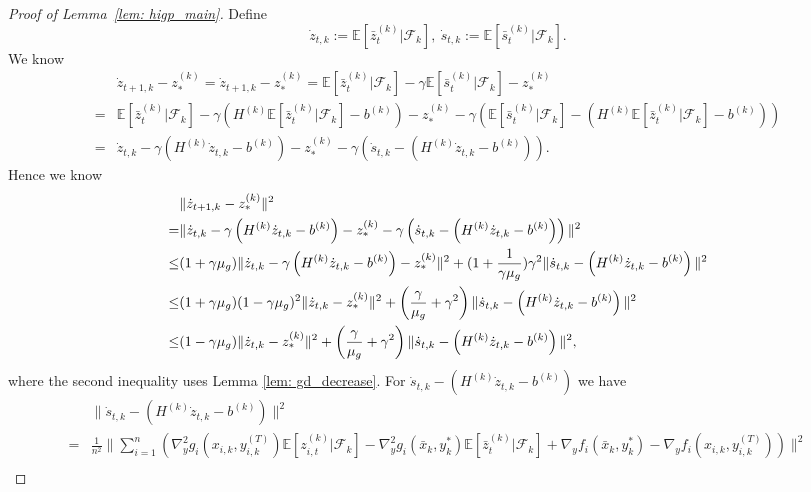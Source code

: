 \documentclass{article}
\theoremstyle{plain}
\theoremstyle{definition}
\theoremstyle{remark}
\newcommand{\E}{\mathbb{E}}
\newcommand{\F}{\mathcal{F}}
\begin{document}
\begin{proof}[Proof of Lemma~\ref{lem: higp_main}]
    Define 
    \[
        \dot{z}_{t,k} := \E\left[\bar{z}_{t}^{(k)}|\F_k\right],\ \dot{s}_{t,k} := \E\left[\bar{s}_{t}^{(k)}|\F_k\right].
    \]
    We know
    \begin{align*}
        &\dot{z}_{t+1,k} - z_*^{(k)} = \dot{z}_{t+1,k} - z_*^{(k)} = \E\left[\bar{z}_{t}^{(k)}|\F_k\right] - \gamma\E\left[\bar{s}_{t}^{(k)}|\F_k\right] - z_*^{(k)} \\
        = &\E\left[\bar{z}_{t}^{(k)}|\F_k\right] - \gamma\left(H^{(k)}\E\left[\bar{z}_{t}^{(k)}|\F_k\right] - b^{(k)}\right) - z_*^{(k)} - \gamma\left(\E\left[\bar{s}_{t}^{(k)}|\F_k\right] - \left(H^{(k)}\E\left[\bar{z}_{t}^{(k)}|\F_k\right] - b^{(k)}\right)\right) \\
        = & \dot{z}_{t,k} - \gamma\left(H^{(k)}\dot{z}_{t,k} - b^{(k)}\right) - z_*^{(k)} - \gamma\left(\dot{s}_{t,k} - \left(H^{(k)}\dot{z}_{t,k} - b^{(k)}\right)\right).
    \end{align*}
    Hence we know
    \begin{align}
        &\|\dot{z}_{t+1,k} - z_*^{(k)}\|^2 \notag \\
        = &\|\dot{z}_{t,k} - \gamma\left(H^{(k)}\dot{z}_{t,k} - b^{(k)}\right) - z_*^{(k)} - \gamma\left(\dot{s}_{t,k} - \left(H^{(k)}\dot{z}_{t,k} - b^{(k)}\right)\right)\|^2 \notag \\
        \leq & (1+\gamma\mu_g)\|\dot{z}_{t,k} - \gamma\left(H^{(k)}\dot{z}_{t,k} - b^{(k)}\right) - z_*^{(k)}\|^2 + (1 + \frac{1}{\gamma\mu_g})\gamma^2\|\dot{s}_{t,k} - \left(H^{(k)}\dot{z}_{t,k} - b^{(k)}\right)\|^2 \notag \\
        \leq & (1+\gamma\mu_g)(1 - \gamma\mu_g)^2\|\dot{z}_{t,k} - z_*^{(k)}\|^2 + \left(\frac{\gamma}{\mu_g} + \gamma^2\right)\|\dot{s}_{t,k} - \left(H^{(k)}\dot{z}_{t,k} - b^{(k)}\right)\|^2 \notag\\
        \leq &(1-\gamma\mu_g)\|\dot{z}_{t,k} - z_*^{(k)}\|^2 + \left(\frac{\gamma}{\mu_g} + \gamma^2\right)\|\dot{s}_{t,k} - \left(H^{(k)}\dot{z}_{t,k} - b^{(k)}\right)\|^2, \label{ineq: dot_z_t}
    \end{align}
    where the second inequality uses Lemma \ref{lem: gd_decrease}. For $\dot{s}_{t,k} - \left(H^{(k)}\dot{z}_{t,k} - b^{(k)}\right)$ we have
    \begin{align*}
        &\|\dot{s}_{t,k} - \left(H^{(k)}\dot{z}_{t,k} - b^{(k)}\right)\|^2 \\
        = &\frac{1}{n^2}\|\sum_{i=1}^{n}\left(\nabla_y^2g_i(x_{i,k},y_{i,k}^{(T)})\E\left[z_{i,t}^{(k)}|\F_k\right] - \nabla_y^2g_i(\bar{x}_k,y_k^*)\E\left[\bar{z}_t^{(k)}|\F_k\right] + \nabla_y f_i(\bar{x}_k, y_k^*) - \nabla_y f_i(x_{i,k}, y_{i,k}^{(T)})\right)\|^2 \\

\end{align*}
\end{proof}
\end{document}
